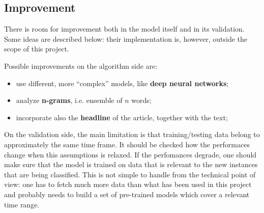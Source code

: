 \documentclass[a4paper,12pt]{article} %
\begin{document}
\subsection{Improvement}
\label{sec:improvement}
There is room for improvement both in the model itself and in its validation.
Some ideas are described below: their implementation is, however, outside
the scope of this project.

Possible improvements on the algorithm side are:
\begin{itemize}
    \item use different, more ``complex'' models, like \textbf{deep neural networks};
    \item analyze \textbf{n-grams}, i.e. ensemble of $n$ words;
    \item incorporate also the \textbf{headline} of the article, together with the text;
\end{itemize}

On the validation side, the main limitation is that training/testing data belong to approximately the same time frame.
It should be checked how the performaces change when this assumptions is relaxed.
If the perfomances degrade, one should make sure that the model is trained on data that is relevant to
the new instances that are being classified.
This is not simple to handle from the technical point of view:
one has to fetch much more data than what has been used in this project and
probably needs to build a set of pre-trained models which cover a relevant time range.


\nocite{*}

%
\renewcommand{\refname}{References}

\end{document}
